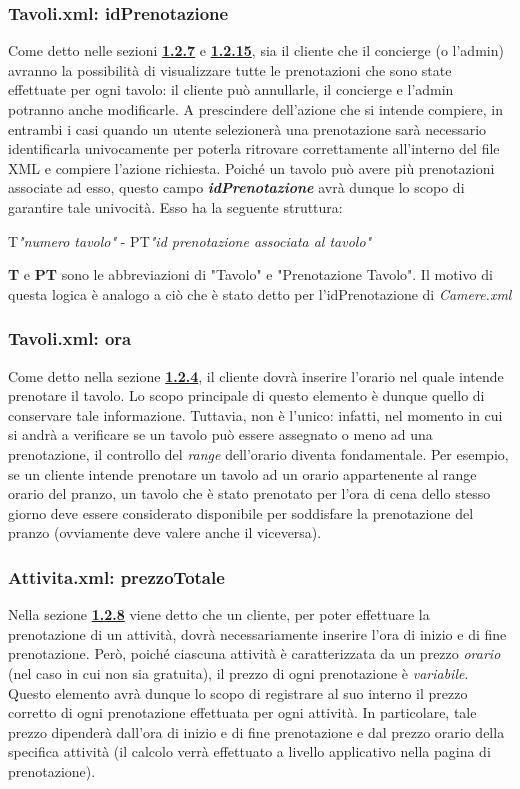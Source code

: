 \documentclass [a4paper, 12pt]{book}
\begin{document}
\subsubsection{Tavoli.xml: idPrenotazione}
Come detto nelle sezioni \hyperref[ServizioRistorazione]{\textbf{1.2.7}} e \hyperref[VisualizzaPrenotazioniClienti]{\textbf{1.2.15}}, sia il cliente che il concierge (o l'admin) avranno la possibilità di visualizzare tutte le prenotazioni che sono state effettuate per ogni tavolo: il cliente può annullarle, il concierge e l'admin potranno anche modificarle. A prescindere dell'azione che si intende compiere, in entrambi i casi quando un utente selezionerà una prenotazione sarà necessario identificarla univocamente per poterla ritrovare correttamente all'interno del file XML e compiere l'azione richiesta. Poiché un tavolo può avere più prenotazioni associate ad esso, questo campo \textbf{\textit{idPrenotazione}} avrà dunque lo scopo di garantire tale univocità. Esso ha la seguente struttura:
\begin{center}
T\textit{"numero tavolo"} - PT\textit{"id prenotazione associata al tavolo"}
\end{center}
\textbf{T} e \textbf{PT} sono le abbreviazioni di "Tavolo" e "Prenotazione Tavolo". Il motivo di questa logica è analogo a ciò che è stato detto per l'idPrenotazione di \textit{Camere.xml}

\subsubsection{Tavoli.xml: ora}
Come detto nella sezione \hyperref[ServizioRistorazione]{\textbf{1.2.4}}, il cliente dovrà inserire l'orario nel quale intende prenotare il tavolo. Lo scopo principale di questo elemento è dunque quello di conservare tale informazione. Tuttavia, non è l'unico: infatti, nel momento in cui si andrà a verificare se un tavolo può essere assegnato o meno ad una prenotazione, il controllo del \textit{range} dell'orario diventa fondamentale. Per esempio, se un cliente intende prenotare un tavolo ad un orario appartenente al range orario del pranzo, un tavolo che è stato prenotato per l'ora di cena dello stesso giorno deve essere considerato disponibile per soddisfare la prenotazione del pranzo (ovviamente deve valere anche il viceversa).

\subsubsection{Attivita.xml: prezzoTotale}
Nella sezione \hyperref[Attività]{\textbf{1.2.8}} viene detto che un cliente, per poter effettuare la prenotazione di un attività, dovrà necessariamente inserire l'ora di inizio e di fine prenotazione. Però, poiché ciascuna attività è caratterizzata da un prezzo \textit{orario} (nel caso in cui non sia gratuita), il prezzo di ogni prenotazione è \textit{variabile}. Questo elemento avrà dunque lo scopo di registrare al suo interno il prezzo corretto di ogni prenotazione effettuata per ogni attività. In particolare, tale prezzo dipenderà dall'ora di inizio e di fine prenotazione e dal prezzo orario della specifica attività (il calcolo verrà effettuato a livello applicativo nella pagina di prenotazione).
\end{document}
